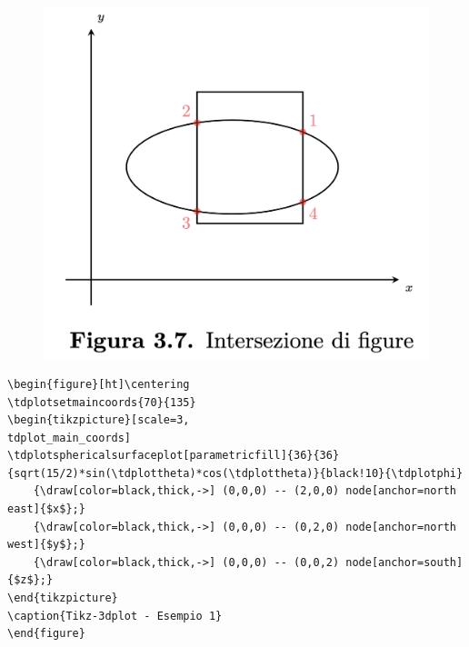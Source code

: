 \begin{figure}[ht]\centering
\includegraphics[scale=.5]{FileAusiliari/Screenshots/Figura3-7.png}
\end{figure}

\newpage
\begin{verbatim}
\begin{figure}[ht]\centering
\tdplotsetmaincoords{70}{135}
\begin{tikzpicture}[scale=3,
tdplot_main_coords]
\tdplotsphericalsurfaceplot[parametricfill]{36}{36}
{sqrt(15/2)*sin(\tdplottheta)*cos(\tdplottheta)}{black!10}{\tdplotphi}
    {\draw[color=black,thick,->] (0,0,0) -- (2,0,0) node[anchor=north east]{$x$};}
    {\draw[color=black,thick,->] (0,0,0) -- (0,2,0) node[anchor=north west]{$y$};}
    {\draw[color=black,thick,->] (0,0,0) -- (0,0,2) node[anchor=south]{$z$};}
\end{tikzpicture}
\caption{Tikz-3dplot - Esempio 1}
\end{figure}
\end{verbatim}

